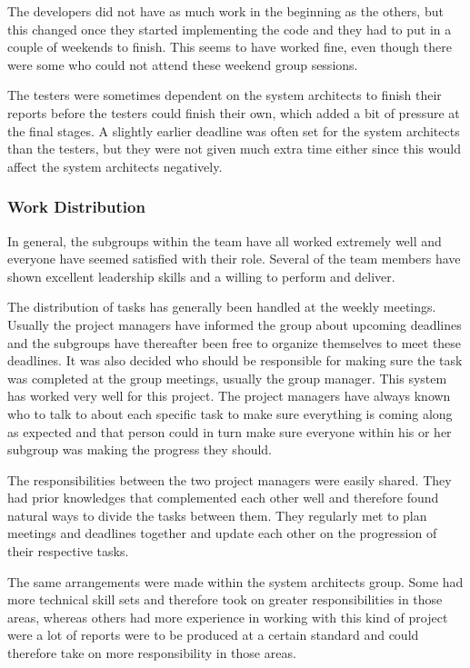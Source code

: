 \documentclass[a4paper]{article}
\begin{document}
The developers did not have as much work in the beginning as the others, but this changed once they started implementing the code and they had to put in a couple of weekends to finish. This seems to have worked fine, even though there were some who could not attend these weekend group sessions.

The testers were sometimes dependent on the system architects to finish their reports before the testers could finish their own, which added a bit of pressure at the final stages. A slightly earlier deadline was often set for the system architects than the testers, but they were not given much extra time either since this would affect the system architects negatively.



\subsubsection{Work Distribution}
In general, the subgroups within the team have all worked extremely well and everyone have seemed satisfied with their role. Several of the team members have shown excellent leadership skills and a willing to perform and deliver.

The distribution of tasks has generally been handled at the weekly meetings. Usually the project managers have informed the group about upcoming deadlines and the subgroups have thereafter been free to organize themselves to meet these deadlines. It was also decided who should be responsible for making sure the task was completed at the group meetings, usually the group manager. This system has worked very well for this project. The project managers have always known who to talk to about each specific task to make sure everything is coming along as expected and that person could in turn make sure everyone within his or her subgroup was making the progress they should. 

The responsibilities between the two project managers were easily shared. They had prior knowledges that complemented each other well and therefore found natural ways to divide the tasks between them. They regularly met to plan meetings and deadlines together and update each other on the progression of their respective tasks. 

The same arrangements were made within the system architects group. Some had more technical skill sets and therefore took on greater responsibilities in those areas, whereas others had more experience in working with this kind of project were a lot of reports were to be produced at a certain standard and could therefore take on more responsibility in those areas. 
\end{document}
